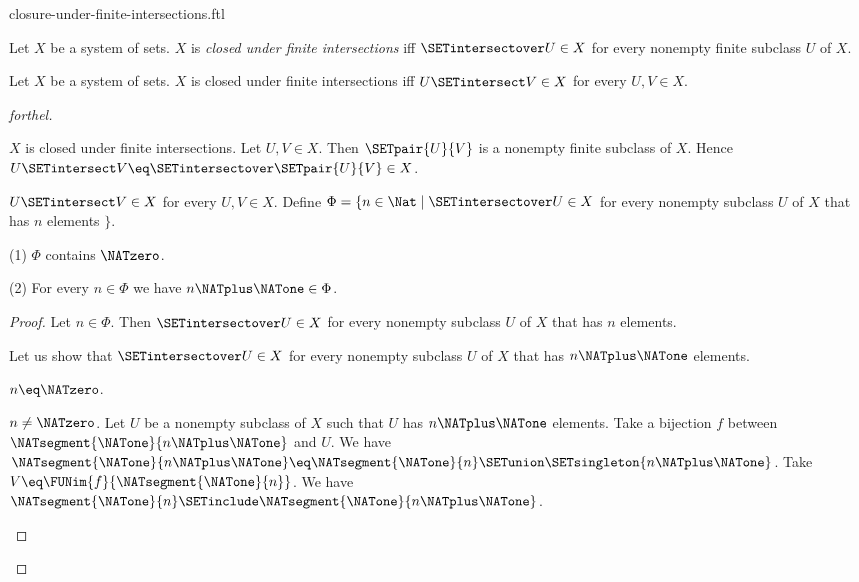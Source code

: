 \documentclass{naproche-library}
\begin{document}
\begin{smodule}[title=Closure Under Finite Intersections]{closure-under-finite-intersections.ftl}

\begin{definition}[forthel,id=FOUNDATIONS_14_4297814324543488]
  Let $X$ be a system of sets.
  $X$ is \emph{closed under finite intersections} iff $\SETintersectover U \in X$ for every nonempty finite subclass $U$ of $X$.
\end{definition}

\begin{proposition}[forthel,id=FOUNDATIONS_17_1405012582334464]
  Let $X$ be a system of sets.
  $X$ is closed under finite intersections iff $U \SETintersect V \in X$ for every $U, V \in X$.
\end{proposition}
\begin{proof}[forthel]
  \begin{case}{$X$ is closed under finite intersections.}
    Let $U, V \in X$.
    Then $\SETpair{U}{V}$ is a nonempty finite subclass of $X$.
    Hence $U \SETintersect V \eq \SETintersectover \SETpair{U}{V} \in X$.
  \end{case}

  \begin{case}{$U \SETintersect V \in X$ for every $U, V \in X$.}
    Define $\Phi = \{ n \in \Nat \mid \SETintersectover U \in X$ for every nonempty subclass $U$ of $X$ that has $n$ elements $\}$.

    (1) $\Phi$ contains $\NATzero$.

    (2) For every $n \in \Phi$ we have $n \NATplus \NATone \in \Phi$.
    \begin{proof}
      Let $n \in \Phi$.
      Then $\SETintersectover U \in X$ for every nonempty subclass $U$ of $X$ that has $n$ elements.

      Let us show that $\SETintersectover U \in X$ for every nonempty subclass $U$ of $X$ that has $n \NATplus \NATone$ elements.

        \begin{case}{$n \eq \NATzero$.} \end{case}

        \begin{case}{$n \neq \NATzero$.}
          Let $U$ be a nonempty subclass of $X$ such that $U$ has $n \NATplus \NATone$ elements.
          Take a bijection $f$ between $\NATsegment{\NATone}{n \NATplus \NATone}$ and $U$.
          We have $\NATsegment{\NATone}{n \NATplus \NATone} \eq \NATsegment{\NATone}{n} \SETunion \SETsingleton{n \NATplus \NATone}$.
          Take $V \eq \FUNim{f}{\NATsegment{\NATone}{n}}$.
          We have $\NATsegment{\NATone}{n} \SETinclude \NATsegment{\NATone}{n \NATplus \NATone}$.


\end{case}
\end{proof}
\end{case}
\end{proof}
\end{smodule}
\end{document}
